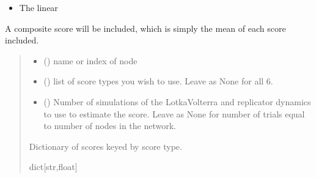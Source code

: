 \documentclass[letterpaper,10pt,english]{sphinxmanual}
\begin{document}
\begin{fulllineitems}
\begin{fulllineitems}
\begin{itemize}
\item {} 
\sphinxAtStartPar
{} The linear {\hyperref[\detokenize{friendlynets:friendlyNet.friendlyNet.stochastic_score}]{}}

\end{itemize}

\sphinxAtStartPar
A composite score will be included, which is simply the mean of each score included.
\begin{quote}\begin{description}
\begin{itemize}
\item {} 
\sphinxAtStartPar
{} () \textendash{} name or index of node

\item {} 
\sphinxAtStartPar
{} () \textendash{} list of score types you wish to use. Leave as None for all 6.

\item {} 
\sphinxAtStartPar
{} () \textendash{} Number of simulations of the Lotka\sphinxhyphen{}Volterra and replicator dynamics to use to estimate the score. Leave as None for number of trials equal to number of nodes in the network.

\end{itemize}

\sphinxAtStartPar
Dictionary of scores keyed by score type.

\sphinxAtStartPar
dict{[}str,float{]}

\end{description}\end{quote}

\end{fulllineitems}



\end{fulllineitems}
\end{document}
